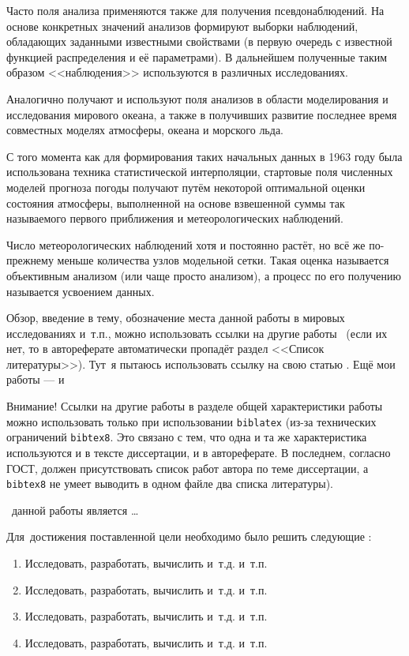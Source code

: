 Часто поля анализа применяются также для получения псевдонаблюдений. На основе конкретных значений анализов формируют выборки наблюдений, обладающих заданными известными свойствами (в первую очередь с известной функцией распределения и её параметрами). В дальнейшем полученные таким образом <<наблюдения>> используются в различных исследованиях.

Аналогично получают и используют поля анализов в области моделирования и исследования мирового океана, а также в получивших развитие последнее время совместных моделях атмосферы, океана и морского льда.

С того момента как для формирования таких начальных данных в 1963 году \cite{Gandin-1963} была использована техника статистической интерполяции, стартовые поля численных моделей прогноза погоды получают путём некоторой оптимальной оценки состояния атмосферы, выполненной на основе взвешенной суммы так называемого первого приближения и метеорологических наблюдений.


Число метеорологических наблюдений хотя и постоянно растёт, но всё же по-прежнему меньше количества узлов модельной сетки. Такая оценка называется объективным анализом (или чаще просто анализом), а процесс по его получению называется усвоением данных.

\newpage
Обзор, введение в тему, обозначение места данной работы в
мировых исследованиях и~т.\:п., можно использовать ссылки на другие
работы~ (если их нет, то в автореферате
автоматически пропадёт раздел <<Список литературы>>).
Тут~я пытаюсь использовать ссылку на свою статью \cite{vak-Mizyak-2013}. Ещё мои работы --- \cite{vak-Slyaeva-2013} и \cite{vak-Tolstykh-2015} 

Внимание! Ссылки
на другие работы в разделе общей характеристики работы можно
использовать только при использовании \verb!biblatex! (из-за технических
ограничений \verb!bibtex8!. Это связано с тем, что одна и та же
характеристика используются и в тексте диссертации, и в
автореферате. В последнем, согласно ГОСТ, должен присутствовать список
работ автора по теме диссертации, а \verb!bibtex8! не умеет выводить в одном
файле два списка литературы).

 \aim\ данной работы является \ldots

Для~достижения поставленной цели необходимо было решить следующие {\tasks}:
\begin{enumerate}
  \item Исследовать, разработать, вычислить и~т.\:д. и~т.\:п.
  \item Исследовать, разработать, вычислить и~т.\:д. и~т.\:п.
  \item Исследовать, разработать, вычислить и~т.\:д. и~т.\:п.
  \item Исследовать, разработать, вычислить и~т.\:д. и~т.\:п.
\end{enumerate}

